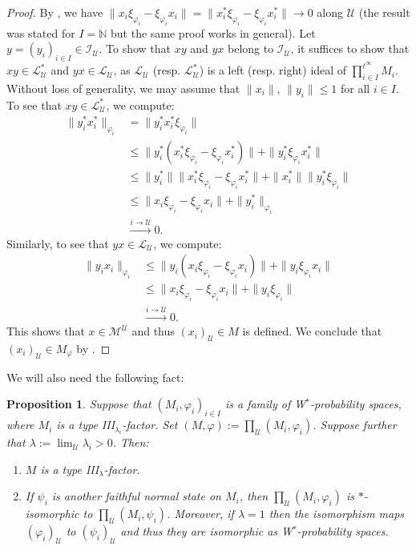 \documentclass[12pt]{amsart}
\newtheorem{prop}[thm]{Proposition}
\theoremstyle{definition}
\def\cal{\mathcal}
\def\u{\mathsf 1}
\newcommand\cU{{\cal U}}
\def \u{\mathcal U}
\begin{document}
\begin{proof}
By \cite[Lemma 2.8 (b)]{haagerup87}, we have $\|x_i\xi_{\varphi_i}-\xi_{\varphi_i}x_i\|=\|x_i^*\xi_{\varphi_i}-\xi_{\varphi_i}x_i^*\|\to 0$ along $\cU$ (the result was stated for $I=\mathbb{N}$ but the same proof works in general). 
Let $y=(y_i)_{i\in I}\in \mathcal{I}_{\cU}$. To show that $xy$ and $yx$ belong to $\mathcal{I}_{\cU}$, it suffices to show that $xy\in \mathcal{L}_{\cU}^*$ and $yx\in \mathcal{L}_{\cU}$, as $\mathcal{L}_{\cU}$ (resp. $\mathcal{L}_{\cU}^*$) is a left  (resp. right) ideal of $\prod_{i\in I}^{\ell^{\infty}}M_i$. Without loss of generality, we may assume that $\|x_i\|,\,\|y_i\|\le 1$ for all $i\in I$.\\

To see that $xy\in \mathcal{L}_{\cU}^*$, we compute:
\begin{align*}
    \|y_i^*x_i^*\|_{\varphi_i}&=\|y_i^*x_i^*\xi_{\varphi_i}\|\\
    &\le \|y_i^*(x_i^*\xi_{\varphi_i}-\xi_{\varphi_i}x_i^*)\|+\|y_i^*\xi_{\varphi_i}x_i^*\|\\
    &\le \|y_i^*\|\|x_i^*\xi_{\varphi_i}-\xi_{\varphi_i}x_i^*\|+\|x_i^*\|\|y_i^*\xi_{\varphi_i}\|\\
    &\le \|x_i\xi_{\varphi_i}-\xi_{\varphi_i}x_i\|+\|y_i^*\|_{\varphi_i}\\
    &\xrightarrow{i\to \cU}0.
\end{align*}
Similarly, to see that $yx\in \mathcal{L}_{\cU}$, we compute: 
\begin{align*}
    \|y_ix_i\|_{\varphi_i}&\le \|y_i(x_i\xi_{\varphi_i}-\xi_{\varphi_i}x_i)\|+\|y_i\xi_{\varphi_i}x_i\|\\
    &\le \|x_i\xi_{\varphi_i}-\xi_{\varphi_i}x_i\|+\|y_i\xi_{\varphi_i}\|\\
    &\xrightarrow{i\to \cU}0.
\end{align*}
This shows that $x\in \mathcal{M}^{\cU}$ and thus $(x_i)_{\cU}\in M$ is defined.  We conclude that $(x_i)_{\cU}\in M_{\varphi}$ by \cite[Lemma 4.36]{AH14}. 
\end{proof}

We will also need the following fact:

\begin{prop}\label{typeofultraproduct}
Suppose that $(M_i,\varphi_i)_{i\in I}$ is a family of W$^*$-probability spaces, where $M_i$ is a type III$_{\lambda_i}$-factor.  Set $(M,\varphi):=\prod_\u (M_i,\varphi_i)$.  Suppose further that $\lambda:=\lim_\u \lambda_i>0$.  Then:  
\begin{enumerate}
    \item $M$ is a type III$_\lambda$-factor.
   \item If $\psi_i$ is another faithful normal state on $M_i$, then $\prod_\u (M_i,\varphi_i)$ is $*$-isomorphic to $\prod_\u (M_i,\psi_i)$. Moreover, if $\lambda=1$ then the isomorphism maps $(\varphi_i)_{\u}$ to $(\psi_i)_{\u}$ and thus they are isomorphic as W$^*$-probability spaces. 
\end{enumerate}  
\end{prop}
\end{document}
